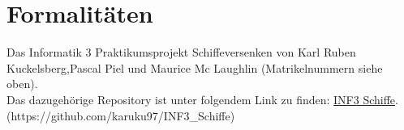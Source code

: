 \section{Formalitäten}

Das Informatik 3 Praktikumsprojekt Schiffeversenken von Karl Ruben Kuckelsberg,\newline Pascal Piel und Maurice Mc Laughlin (Matrikelnummern siehe oben).\\
Das dazugehörige Repository ist unter folgendem Link zu finden: \href{https://github.com/karuku97/INF3_Schiffe}{INF3 Schiffe}.\\
(https://github.com/karuku97/INF3\_Schiffe)


